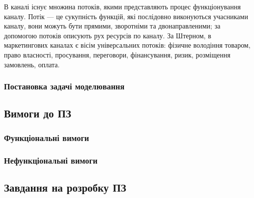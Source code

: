 В каналі існує множина потоків, якими представляють процес функціонування каналу. Потік --- це сукупність функцій, які послідовно виконуються учасниками каналу, вони можуть бути прямими, зворотніми та двонаправленими\cite{stern}; за допомогою потоків описують рух ресурсів по каналу. За Штерном, в маркетингових каналах є вісім універсальних потоків\cite{stern}: фізичне володіння товаром, право власності, просування, переговори, фінансування, ризик, розміщення замовлень, оплата.

        \subsubsection{Постановка задачі моделювання}
 
    \subsection{Вимоги до ПЗ}
        \subsubsection{Функціональні вимоги}

        \subsubsection{Нефункціональні вимоги}
        
\subsection{Завдання на розробку ПЗ}